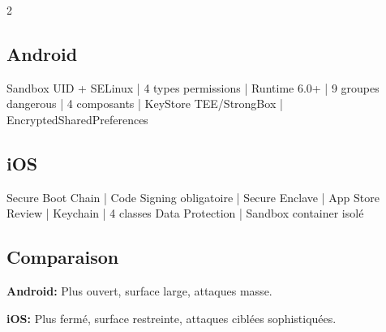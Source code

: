 \documentclass[9pt,a4paper]{extarticle}
\begin{document}
\begin{multicols}{2}
\subsection*{Android}
Sandbox UID + SELinux | 4 types permissions | Runtime 6.0+ | 9 groupes dangerous | 4 composants | KeyStore TEE/StrongBox | EncryptedSharedPreferences

\subsection*{iOS}
Secure Boot Chain | Code Signing obligatoire | Secure Enclave | App Store Review | Keychain | 4 classes Data Protection | Sandbox container isolé

\subsection*{Comparaison}
\textbf{Android:} Plus ouvert, surface large, attaques masse.

\textbf{iOS:} Plus fermé, surface restreinte, attaques ciblées sophistiquées.

\end{multicols}
\end{document}
